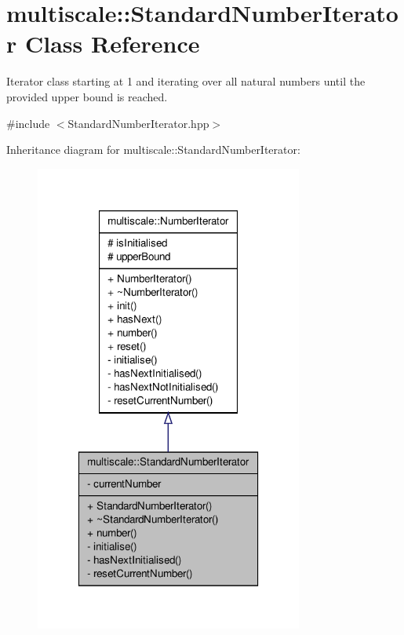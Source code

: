 \hypertarget{classmultiscale_1_1StandardNumberIterator}{\section{multiscale\-:\-:\-Standard\-Number\-Iterator \-Class \-Reference}
\label{classmultiscale_1_1StandardNumberIterator}
}


\-Iterator class starting at 1 and iterating over all natural numbers until the provided upper bound is reached.  




{\ttfamily \#include $<$\-Standard\-Number\-Iterator.\-hpp$>$}



\-Inheritance diagram for multiscale\-:\-:\-Standard\-Number\-Iterator\-:
\nopagebreak
\begin{figure}[H]
\begin{center}
\leavevmode
\includegraphics[width=250pt]{classmultiscale_1_1StandardNumberIterator__inherit__graph}
\end{center}
\end{figure}


